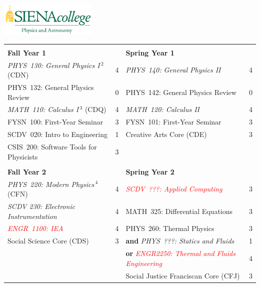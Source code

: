 \documentclass[12pt]{article}
\begin{document}
\hfill \includegraphics[width=0.35\textwidth]{siena_phys_astro_print_crop.jpg}

\vspace{0.1cm}
\vspace{0.1cm}

    \small
\vspace*{-5mm}
\begin{table}[h!]
\begin{center}
{\renewcommand{\arraystretch}{1.2}
\begin{tabular*}{0.9\textwidth}{@{\extracolsep{\fill}}lclc}
 & \\
{\Large \textbf{Fall Year 1}} & & {\Large \textbf{Spring Year 1}} & \\
\hline
{\em PHYS~130: General Physics I}\,$^{2}$ (CDN)& 4 & {\em PHYS~140: General Physics II}     & 4 \\
PHYS~132: General Physics Review           & 0 & PHYS~142: General Physics Review & 0\\
{\em MATH~110: Calculus I}\,$^{3}$ (CDQ)   & 4 & {\em MATH~120: Calculus II}            & 4 \\
FYSN~100: First-Year Seminar               & 3 & FYSN~101: First-Year Seminar     & 3\\
SCDV~020: Intro to Engineering             & 1 & Creative Arts Core (CDE)         & 3 \\
CSIS~200: Software Tools for Physicists    & 3 &  \\

 & \\
{\Large \textbf{Fall Year 2}} & & {\Large \textbf{Spring Year 2}} & \\
\hline
{\em PHYS~220: Modern Physics}\,$^{4}$ (CFN)& 4 &\textcolor{red}{\em SCDV~???: Applied Computing} & 3  \\ 
{\em SCDV 230: Electronic Instrumentation} & 4 &MATH~325: Differential Equations & 3 \\ 
{\em \textcolor{red}{ENGR~1100: IEA}}& 4 & PHYS~260: Thermal Physics        & 3 \\
Social Science Core (CDS)            & 3 & {\bf and} {\em PHYS~???: Statics and Fluids} & 1 \\
                                          &   & {\bf or} \textcolor{red}{\em ENGR2250: Thermal and Fluids Engineering} & 4 \\
                                          &   &   Social Justice Franciscan Core (CFJ) & 3 \\


\end{tabular*}}
\end{center}
\end{table}
\end{document}
